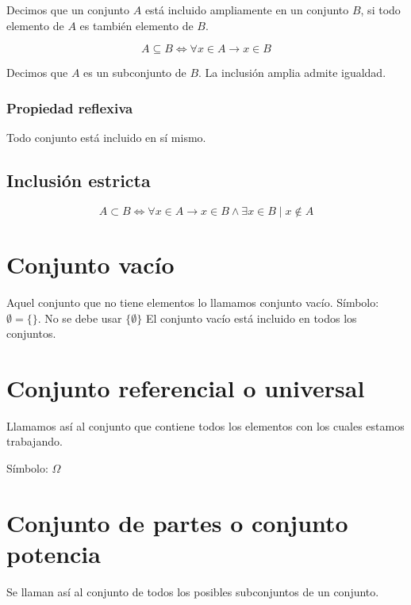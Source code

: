 \documentclass{article}
\begin{document}
    Decimos que un conjunto $A$ está incluido ampliamente en un conjunto
    $B$, si todo elemento de $A$ es también elemento de $B$.

    \[
        A \subseteq B \iff \forall x \in A \rightarrow x \in B
    \]

    Decimos que $A$ es un subconjunto de $B$.
    La inclusión amplia admite igualdad.

    \subsubsection{Propiedad reflexiva}

    Todo conjunto está incluido en sí mismo.

    \subsection{Inclusión estricta}

    \[
        A \subset B \iff \forall x \in A \rightarrow x \in B \land \exists x \in B \mid x \notin A
    \]

    \section{Conjunto vacío}

    Aquel conjunto que no tiene elementos lo llamamos conjunto vacío. \newline
    Símbolo: $\emptyset = \{ \}$. \newline
    No se debe usar ${ \{ \emptyset \} }$ \newline
    El conjunto vacío está incluido en todos los conjuntos.
    
    \section{Conjunto referencial o universal}

    Llamamos así al conjunto que contiene todos los elementos con los cuales
    estamos trabajando.

    Símbolo: $\Omega$

    \section{Conjunto de partes o conjunto potencia}

    Se llaman así al conjunto de todos los posibles subconjuntos de un
    conjunto.
\end{document}
